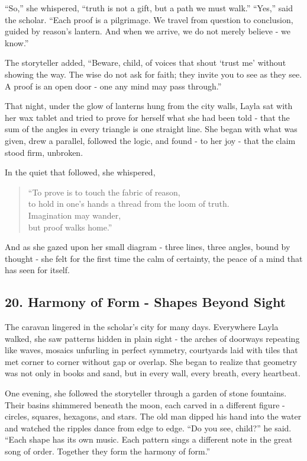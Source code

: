 \documentclass[
  letterpaper,
  DIV=11,
  numbers=noendperiod]{scrreprt}
\begin{document}
``So,'' she whispered, ``truth is not a gift, but a path we must walk.''
``Yes,'' said the scholar. ``Each proof is a pilgrimage. We travel from
question to conclusion, guided by reason's lantern. And when we arrive,
we do not merely believe - we know.''

The storyteller added, ``Beware, child, of voices that shout `trust me'
without showing the way. The wise do not ask for faith; they invite you
to see as they see. A proof is an open door - one any mind may pass
through.''

That night, under the glow of lanterns hung from the city walls, Layla
sat with her wax tablet and tried to prove for herself what she had been
told - that the sum of the angles in every triangle is one straight
line. She began with what was given, drew a parallel, followed the
logic, and found - to her joy - that the claim stood firm, unbroken.

In the quiet that followed, she whispered,

\begin{quote}
``To prove is to touch the fabric of reason,\\
to hold in one's hands a thread from the loom of truth.\\
Imagination may wander,\\
but proof walks home.''
\end{quote}

And as she gazed upon her small diagram - three lines, three angles,
bound by thought - she felt for the first time the calm of certainty,
the peace of a mind that has seen for itself.

\subsection{20. Harmony of Form - Shapes Beyond
Sight}\label{harmony-of-form---shapes-beyond-sight}

The caravan lingered in the scholar's city for many days. Everywhere
Layla walked, she saw patterns hidden in plain sight - the arches of
doorways repeating like waves, mosaics unfurling in perfect symmetry,
courtyards laid with tiles that met corner to corner without gap or
overlap. She began to realize that geometry was not only in books and
sand, but in every wall, every breath, every heartbeat.

One evening, she followed the storyteller through a garden of stone
fountains. Their basins shimmered beneath the moon, each carved in a
different figure - circles, squares, hexagons, and stars. The old man
dipped his hand into the water and watched the ripples dance from edge
to edge. ``Do you see, child?'' he said. ``Each shape has its own music.
Each pattern sings a different note in the great song of order. Together
they form the harmony of form.''
\end{document}
